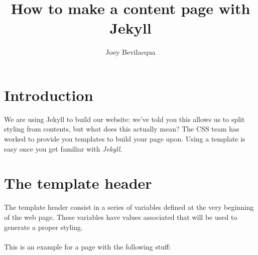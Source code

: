 \documentclass[hidelinks,12pt,a4paper,numbers=enddot]{scrartcl}
\title{How to make a content page with Jekyll}
\author{Joey Bevilacqua}
\begin{document}
\maketitle
\tableofcontents
\listoffigures
\newpage

\section{Introduction}
We are using Jekyll to build our website: we've told you this allows us to split
styling from contents, but what does this actually mean?
The CSS team has worked to provide you templates to build your page upon.
Using a template is easy once you get familiar with \textit{Jekyll}.

\section{The template header}

The template header consist in a series of variables defined at the very beginning
of the web page. These variables have values associated that will be used
to generate a proper styling.

\paragraph{}
This is an example for a page with the following stuff:

\begin{table}[h]
\end{table}
\end{document}
